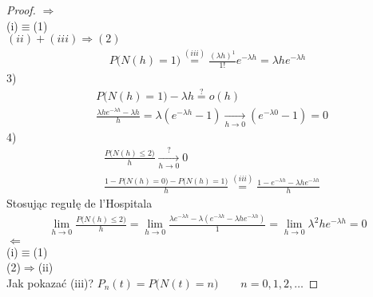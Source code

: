 \begin{proof}
{\Large $ \Rightarrow $}\\
(i)$ \equiv $(1)\\
$ (ii)+(iii)\Rightarrow(2) $\\
\begin{gather*}
P\bigl(N(h)=1\bigr)\stackrel{(iii)}{=}
\frac{(\lambda h)^1}{1!}e^{-\lambda h}=
\lambda he^{-\lambda h}
\end{gather*}
3)
\begin{align*}
&P\bigl(N(h)=1\bigr)-\lambda h\stackrel{?}{=}o(h)\\
&\frac{\lambda he^{-\lambda h}-\lambda h}{h}=
\lambda  \left(e^{-\lambda h}-1\right)\xrightarrow[h\to0]{}
\left(e^{-\lambda 0}-1\right)=0
\end{align*}
4)
\begin{align*}
&\frac{P\bigl(N(h)\le 2\bigr)}{h}\xrightarrow[h\to0]{?}0\\
&\frac{1-P\bigl(N(h)=0\bigr)-P\bigl(N(h)=1\bigr)}{h}\stackrel{(iii)}{=}
\frac{1-e^{-\lambda h}-\lambda he^{-\lambda h}}{h}
\end{align*}
Stosując regułę de l'Hospitala
\begin{gather*}
\lim\limits_{h\to0} \frac{P\bigl(N(h)\le 2\bigr)}{h}=
\lim\limits_{h\to0} \frac{\lambda  e^{-\lambda h }-\lambda  \left(e^{-\lambda h }-\lambda h  e^{-\lambda h }\right)}{1}=
\lim\limits_{h\to0} \lambda ^2 h e^{-\lambda h }=0
\end{gather*}
{\Large $ \Leftarrow $}\\
(i)$ \equiv $(1)\\
(2)$ \Rightarrow $(ii)\\
Jak pokazać (iii)? $ P_n(t)=P\bigl(N(t)=n\bigr) \qquad n=0,1,2,\dots $


\end{proof}
